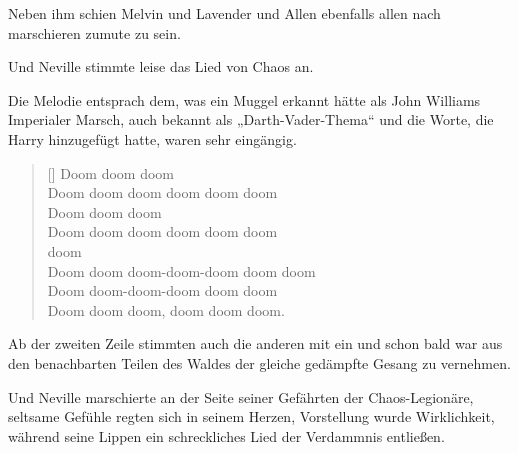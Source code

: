 Neben ihm schien Melvin und Lavender und Allen ebenfalls allen nach marschieren zumute zu sein.

Und Neville stimmte leise das Lied von Chaos an.

Die Melodie entsprach dem, was ein Muggel erkannt hätte als John Williams Imperialer Marsch, auch bekannt als „Darth-Vader-Thema“ und die Worte, die Harry hinzugefügt hatte, waren sehr eingängig.%

\baselineskip\settowidth{\versewidth}{Doom doom doom-doom-doom doom doom}
\begin{verse}[\versewidth]
Doom doom doom\\
Doom doom doom doom doom doom\\
Doom doom doom\\
Doom doom doom doom doom doom\\
 doom \\
Doom doom doom-doom-doom doom doom\\
Doom doom-doom-doom doom doom\\
Doom doom doom, doom doom doom.
\end{verse}\baselineskip

Ab der zweiten Zeile stimmten auch die anderen mit ein und schon bald war aus den benachbarten Teilen des Waldes der gleiche gedämpfte Gesang zu vernehmen.

Und Neville marschierte an der Seite seiner Gefährten der Chaos-Legionäre, seltsame Gefühle regten sich in seinem Herzen, Vorstellung wurde Wirklichkeit, während seine Lippen ein schreckliches Lied der Verdammnis entließen.

